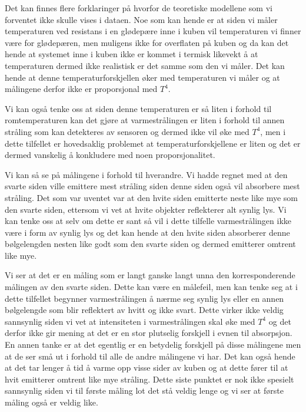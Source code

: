 Det kan finnes flere forklaringer på hvorfor de teoretiske modellene som vi forventet ikke skulle vises i dataen. Noe som kan hende er at siden vi måler temperaturen ved resistans i en glødepære inne i kuben vil temperaturen vi finner være for glødepæren, men muligens ikke for overflaten på kuben og da kan det hende at systemet inne i kuben ikke er kommet i termisk likevekt å at temperaturen dermed ikke realistisk er det samme som den vi måler. Det kan hende at denne temperaturforskjellen øker med temperaturen vi måler og at målingene derfor ikke er proporsjonal med $T^{4}$.

Vi kan også tenke oss at siden denne temperaturen er så liten i forhold til romtemperaturen kan det gjøre at varmestrålingen er liten i forhold til annen stråling som kan detekteres av sensoren og dermed ikke vil øke med $T^{4}$, men i dette tilfellet er hovedsaklig problemet at temperaturforskjellene er liten og det er dermed vanskelig å konkludere med noen proporsjonalitet.

Vi kan så se på målingene i forhold til hverandre. Vi hadde regnet med at den svarte siden ville emittere mest stråling siden denne siden også vil absorbere mest stråling. Det som var uventet var at den hvite siden emitterte neste like mye som den svarte siden, ettersom vi vet at hvite objekter reflekterer alt synlig lys. Vi kan tenke oss at selv om dette er sant så vil i dette tilfelle varmestrålingen ikke være i form av synlig lys og det kan hende at den hvite siden absorberer denne bølgelengden nesten like godt som den svarte siden og dermed emitterer omtrent like mye.

Vi ser at det er en måling som er langt ganske langt unna den korresponderende målingen av den svarte siden. Dette kan være en målefeil, men kan tenke seg at i dette tilfellet begynner varmestrålingen å nærme seg synlig lys eller en annen bølgelengde som blir reflektert av hvitt og ikke svart. Dette virker ikke veldig sannsynlig siden vi vet at intensiteten i varmestrålingen skal øke med $T^{4}$ og det derfor ikke gir mening at det er en stor plutselig forskjell i evnen til absorpsjon. En annen tanke er at det egentlig er en betydelig forskjell på disse målingene men at de ser små ut i forhold til alle de andre målingene vi har. Det kan også hende at det tar lenger å tid å varme opp visse sider av kuben og at dette fører til at hvit emitterer omtrent like mye stråling. Dette siste punktet er nok ikke spesielt sannsynlig siden vi til første måling lot det stå veldig lenge og vi ser at første måling også er veldig like.



